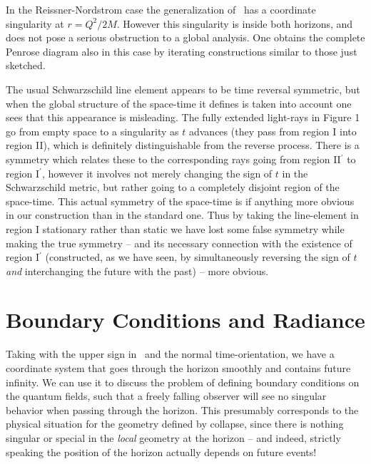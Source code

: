 In the Reissner-Nordstrom case the generalization of \nicemetric\
has
a coordinate singularity at $r=Q^2/2M$.  However this singularity
is inside both horizons, and does not pose a serious obstruction to
a global analysis.  One obtains the complete Penrose diagram also in
this case by
iterating
constructions similar to those just sketched.



The usual
Schwarzschild line element appears to be time reversal symmetric,
but when the global structure of the space-time it defines is taken into
account one sees that this appearance is misleading.  The fully extended
light-rays in Figure 1 go from empty space to a singularity as $t$
advances (they pass from region I into region II),
which is definitely distinguishable from the
reverse process.  There is a
symmetry which relates these to the corresponding rays going from
region II$^\prime$ to region I$^\prime$, however it involves not merely
changing the sign of
$t$ in the Schwarzschild metric,
but rather going to a completely disjoint
region of the space-time.  This actual symmetry of the space-time is if
anything more obvious in our construction than in the standard one.
Thus by taking the line-element
in region I stationary rather than static
we have lost some false symmetry while making the true symmetry --
and its
necessary
connection with the existence of
region I$^\prime$ (constructed, as we have seen, by simultaneously
reversing the
sign of $t$ {\it and\/} interchanging the future with the past) --
more obvious.



\chapter{Boundary Conditions and Radiance}


Taking with the upper sign in \nicemetric\ and the normal
time-orientation,
we have a coordinate system that goes through the horizon
smoothly
and contains future infinity.  We can
use it to
discuss the problem of
defining boundary conditions on the quantum
fields, such that a freely falling observer will see
no singular
behavior when passing through the horizon.
This presumably corresponds to the physical situation
for the geometry defined by collapse, since there is nothing
singular or special in the {\it local\/} geometry at the horizon
-- and indeed, strictly speaking
the position of the horizon actually depends on
future events!

